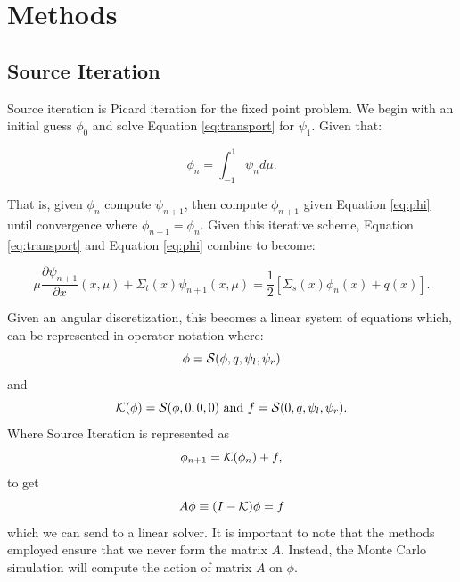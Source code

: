 \section{Methods}
\label{sec:methods}



\subsection{Source Iteration}
Source iteration is Picard iteration for the fixed point problem. We begin with an initial guess $\phi_0$ and solve Equation \ref{eq:transport} for $\psi_1$. Given that:

\begin{equation}
	\label{eq:phi}
	\phi_n = \int_{-1}^{1}\psi_n d\mu .
\end{equation}

That is, given $\phi_n$ compute $\psi_{n+1}$, then compute $\phi_{n+1}$ given Equation \ref{eq:phi} until convergence where $\phi_{n+1} = \phi_{n}$. Given this iterative scheme, Equation \ref{eq:transport} and Equation \ref{eq:phi} combine to become:

\begin{equation}\label{equation:SI}
    \mu\frac{\partial\psi_{n+1}}{\partial x}(x,\mu)+ \Sigma_t(x)\psi_{n+1}(x,\mu) = \frac{1}{2} \left[ \Sigma_s(x)\phi_{n}(x) + q(x)\right].
\end{equation}

Given an angular discretization, this becomes a linear system of equations which, can be represented in operator notation where:
\[
	\phi = {\cal S}(\phi, q, \psi_l, \psi_r)
\]
and
\[
	{\cal K}(\phi) = {\cal S}(\phi, 0, 0, 0) \mbox{ and }
	f = {\cal S}(0, q, \psi_l, \psi_r).
\]
Where Source Iteration is represented as
\[
	\phi_{n+1} = {\cal K}(\phi_n) + f,
\]
to get
\[
	A \phi \equiv (I - {\cal K}) \phi = f
\]
which we can send to a linear solver. It is important to note that the methods employed ensure that we never form the matrix $A$.  Instead, the Monte Carlo simulation will compute the action of matrix $A$ on $\phi$.



